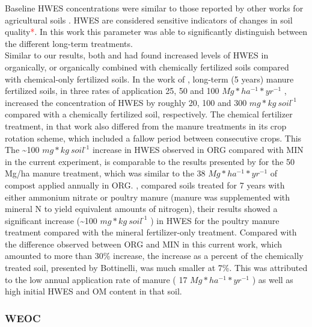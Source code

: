 \documentclass[12pt]{report}
\newcommand{\myRed}[1]{\textcolor{red}{#1}} %
\newlength{\SpaceAfterUnit}
\newcommand{\genericunit}{$ mg * kg\ soil^{\text{-}1}$ \hspace*{\SpaceAfterUnit}}
\begin{document}
Baseline HWES concentrations were similar to those reported by other works for agricultural soils \citep{haynes2005, yousefi2008, puget1998}. HWES are considered sensitive indicators of changes in soil quality\myRed{*}. In this work this parameter was able to significantly distinguish between the different long-term treatments.\\
Similar to our results, both \citet{yousefi2008} and \citet{bottinelli2017} had found increased levels of HWES in organically, or organically combined with chemically fertilized soils compared with chemical-only fertilized soils.
In the work of \citet{yousefi2008}, long-term (5 years) manure fertilized soils, in three rates of application  25, 50 and 100 $ Mg * ha^{-1} * yr^{-1}  $ , increased the concentration of HWES by roughly 20, 100 and 300 \genericunit compared with a chemically fertilized soil, respectively. The chemical fertilizer treatment, in that work also differed from the manure treatments in its crop rotation scheme, which included a fallow period between consecutive crops. This The \~{}100 \genericunit increase in HWES observed in ORG compared with MIN in the current experiment, is comparable to the results presented by \citeauthor{yousefi2008} for the 50 Mg/ha manure treatment, which was similar to the 38 $ Mg * ha^{-1} * yr^{-1}  $ of compost applied annually in ORG.
\citet{bottinelli2017}, compared soils treated for 7 years with either ammonium nitrate or poultry manure (manure was supplemented with mineral N to yield equivalent amounts of nitrogen), their results  showed a significant increase (\~{}100 \genericunit) in HWES for the poultry manure treatment compared with the mineral fertilizer-only treatment.
Compared with the difference observed between ORG and MIN in this current work, which amounted to more than 30\% increase, the increase as a percent of the  chemically treated soil, presented by Bottinelli, was much smaller at 7\%. This was attributed to the low annual application rate of manure ( 17 $ Mg * ha^{-1} * yr^{-1}  $ ) as well as high initial HWES and OM content in that soil.

\subsubsection{WEOC}
\end{document}
